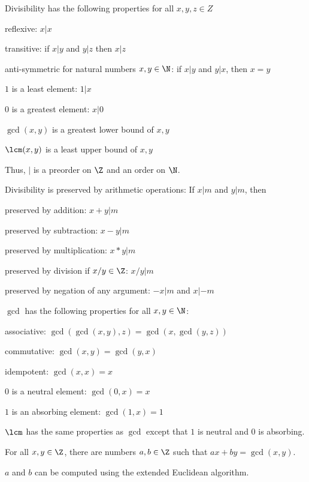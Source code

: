 \begin{theorem}[Divisibility]
Divisibility has the following properties for all $x,y,z\in Z$
\begin{compactitem}
\item reflexive: $x|x$
\item transitive: if $x|y$ and $y|z$ then $x|z$
\item anti-symmetric for natural numbers $x,y\in \N$: if $x|y$ and $y|x$, then $x=y$
\item $1$ is a least element: $1|x$
\item $0$ is a greatest element: $x|0$
\item $\gcd(x,y)$ is a greatest lower bound of $x,y$
\item $\lcm(x,y)$ is a least upper bound of $x,y$
\end{compactitem}
Thus, $|$ is a preorder on $\Z$ and an order on $\N$.
\medskip

Divisibility is preserved by arithmetic operations: If $x|m$ and $y|m$, then
\begin{compactitem}
\item preserved by addition: $x+y|m$
\item preserved by subtraction: $x-y|m$
\item preserved by multiplication: $x*y|m$
\item preserved by division if $x/y\in \Z$: $x/y|m$
\item preserved by negation of any argument: $-x|m$ and $x|-m$
\end{compactitem}
\medskip

$\gcd$ has the following properties for all $x,y\in\N$:
\begin{compactitem}
\item associative: $\gcd(\gcd(x,y),z)=\gcd(x,\gcd(y,z))$
\item commutative: $\gcd(x,y)=\gcd(y,x)$
\item idempotent: $\gcd(x,x)=x$
\item $0$ is a neutral element: $\gcd(0,x)=x$
\item $1$ is an absorbing element: $\gcd(1,x)=1$
\end{compactitem}
$\lcm$ has the same properties as $\gcd$ except that $1$ is neutral and $0$ is absorbing.
\end{theorem}

\begin{theorem}\label{thm:math:extendedeuclid}
For all $x,y\in\Z$, there are numbers $a,b\in\Z$ such that $ax+by=\gcd(x,y)$.

$a$ and $b$ can be computed using the extended Euclidean algorithm.
\end{theorem}

